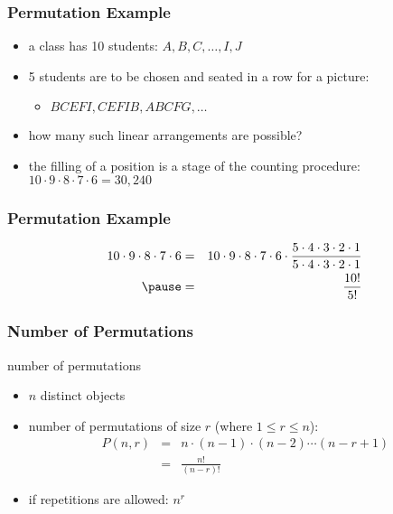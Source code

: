 \documentclass[dvipsnames]{beamer}
\begin{document}
\begin{frame}
  \frametitle{Permutation Example}

  \begin{example}
    \begin{itemize}
      \item a class has 10 students: $A, B, C, \ldots, I, J$
      \item 5 students are to be chosen and seated in a row for a picture:
      \begin{itemize}
        \item $BCEFI, CEFIB, ABCFG, \ldots$
      \end{itemize}
      \item how many such linear arrangements are possible?

      \pause
      \medskip
      \item the filling of a position is a stage of the counting procedure:\\
        $10 \cdot 9 \cdot 8 \cdot 7 \cdot 6 = 30,240$
    \end{itemize}
  \end{example}
\end{frame}

\begin{frame}
  \frametitle{Permutation Example}

  \begin{example}
    \begin{eqnarray*}
    10 \cdot 9 \cdot 8 \cdot 7 \cdot 6 & = &
      10 \cdot 9 \cdot 8 \cdot 7 \cdot 6 \cdot
      \frac{5 \cdot 4 \cdot 3 \cdot 2 \cdot 1}
      {5 \cdot 4 \cdot 3 \cdot 2 \cdot 1}\\\pause
    & = & \frac{10!}{5!}
    \end{eqnarray*}
  \end{example}
\end{frame}

\begin{frame}
  \frametitle{Number of Permutations}

  \begin{block}{number of permutations}
    \begin{itemize}
      \item $n$ distinct objects
      \item number of permutations of size $r$ (where $1 \leq r \leq n$):\\
      \begin{eqnarray*}
        P(n,r) & = & n \cdot (n-1) \cdot (n-2) \cdots (n-r+1)\\
               & = & \frac{n!}{(n-r)!}
      \end{eqnarray*}

      \pause
      \medskip
      \item if repetitions are allowed: $n^r$
    \end{itemize}
  \end{block}
\end{frame}
\end{document}
